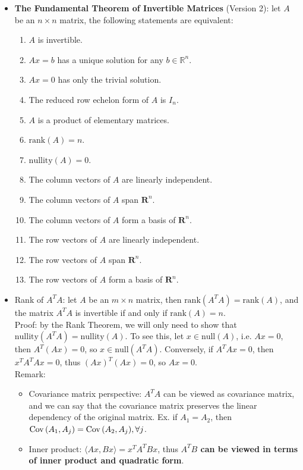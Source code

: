\documentclass{report}
\begin{document}
\begin{itemize}
\item \textbf{The Fundamental Theorem of Invertible Matrices} (Version 2): let $A$ be an $n \times n$ matrix, the following statements are equivalent: 
\begin{enumerate}
	\item $A$ is invertible. 
	\item $Ax = b$ has a unique solution for any $b \in \mathbb{R}^n$. 
	\item $Ax = 0$ has only the trivial solution. 
	\item The reduced row echelon form of $A$ is $I_n$. 
	\item $A$ is a product of elementary matrices. 
	\item $\text{rank}(A) = n$. 
	\item $\text{nullity}(A) = 0$. 
	\item The column vectors of $A$ are linearly independent. 
	\item The column vectors of $A$ span $\mathbf{R}^n$. 
	\item The column vectors of $A$ form a basis of $\mathbf{R}^n$. 
	\item The row vectors of $A$ are linearly independent. 
	\item The row vectors of $A$ span $\mathbf{R}^n$. 
	\item The row vectors of $A$ form a basis of $\mathbf{R}^n$.
\end{enumerate}

\item Rank of $A^T A$: let $A$ be an $m \times n$ matrix, then $\text{rank}(A^T A) = \text{rank}(A)$, and the matrix $A^T A$ is invertible if and only if $\text{rank}(A) = n$. \\
Proof: by the Rank Theorem, we will only need to show that $\text{nullity}(A^T A) = \text{nullity}(A)$. To see this, let $x \in \text{null}(A)$, i.e. $A x= 0$, then $A^T (A x) = 0$, so $x \in \text{null}(A^T A)$. Conversely, if $A^T A x = 0$, then $x^T A^T A x = 0$, thus $(Ax)^T (Ax) = 0$, so $Ax = 0$. \\
Remark: 
\begin{itemize}
	\item Covariance matrix perspective: $A^TA$ can be viewed as covariance matrix, and we can say that the covariance matrix preserves the linear dependency of the original matrix. Ex. if $A_1 = A_2$, then ${\rm Cov}\,(A_1, A_j) = {\rm Cov}\,(A_2, A_j), \forall j$. 
	
	\item Inner product: $\langle Ax, Bx\rangle = x^T A^T B x$, thus \textbf{$A^T B$ can be viewed in terms of inner product and quadratic form}.  
\end{itemize}
 


\end{itemize}
\end{document}
